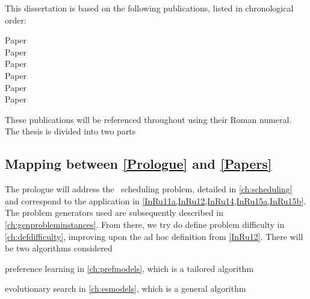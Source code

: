 This dissertation is based on the following publications, listed in 
chronological order:
{\raggedright
\begin{description} 
    \item[Paper ] 
    \item[Paper ] 
    \item[Paper  ] 
    \item[Paper  ] 
    \item[Paper ] 
    \item[Paper ] 
\end{description}}

\noindent These publications will be referenced throughout using their Roman 
numeral. 
The thesis is divided into two parts
\begin{enumerate*}[label={{}}]
    \item \emph{}
    \item \emph{}
\end{enumerate*}
\makeatletter 
{}
\makeatother

\clearpage
\subsection*{Mapping between \cref{Prologue} and \cref{Papers}}
The prologue will address the \jsp\ scheduling problem, detailed in 
\cref{ch:scheduling} and correspond to the application in 
\cref{InRu11a,InRu12,InRu14,InRu15a,InRu15b}. The problem generators 
used are subsequently described in \cref{ch:genprobleminstances}.
From there, we try do define problem difficulty in \cref{ch:defdifficulty}, 
improving upon the ad hoc definition from \cref{InRu12}. 
There will be two algorithms considered
\begin{enumerate*}
    \item preference learning in \cref{ch:prefmodels}, which is a tailored 
    algorithm
    \item evolutionary search in \cref{ch:esmodels}, which is a general 
    algorithm
\end{enumerate*}

